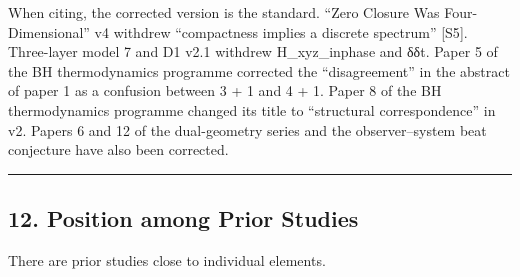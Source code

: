 \documentclass[
  a4paper,
]{article}
\begin{document}
When citing, the corrected version is the standard. ``Zero Closure Was
Four-Dimensional'' v4 withdrew ``compactness implies a discrete
spectrum'' {[}S5{]}. Three-layer model 7 and D1 v2.1 withdrew
H\_xyz\_inphase and δδt. Paper 5 of the BH thermodynamics programme
corrected the ``disagreement'' in the abstract of paper 1 as a confusion
between 3 + 1 and 4 + 1. Paper 8 of the BH thermodynamics programme
changed its title to ``structural correspondence'' in v2. Papers 6 and
12 of the dual-geometry series and the observer--system beat conjecture
have also been corrected.

\begin{center}\rule{0.5\linewidth}{0.5pt}\end{center}

\subsection{12. Position among Prior
Studies}\label{position-among-prior-studies}

There are prior studies close to individual elements.
\end{document}

